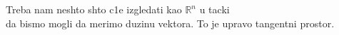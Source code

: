 \documentclass[preview]{standalone}
\begin{document}
\begin{center}
Treba nam neshto shto c1e izgledati kao \(\mathbb{R}^n\) u tacki\\
        da bismo mogli da merimo duzinu vektora. To je upravo tangentni prostor.
\end{center}
\end{document}
